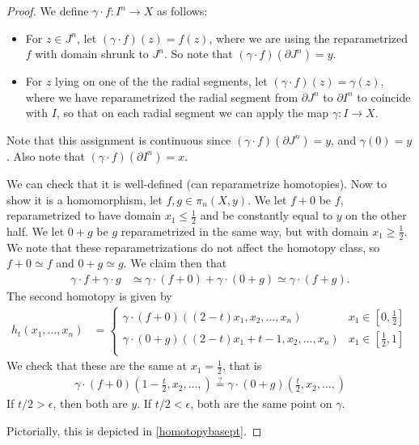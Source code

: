 \documentclass{article}[11pt]
\begin{document}
\begin{proof}
We define $\gamma\cdot f\colon I^n\to X$ as follows:
\begin{itemize}\itemsep=0em
\item For $z\in J^n$, let $(\gamma\cdot f)(z)=f(z)$, where we are using the reparametrized $f$ with domain shrunk to $J^n$. So note that $(\gamma\cdot f)(\partial J^n)=y.$
\item For $z$ lying on one of the the radial segments, let $(\gamma\cdot f)(z)=\gamma(z)$, where we have reparametrized the radial segment from $\partial J^n$ to $\partial I^n$ to coincide with $I$, so that on each radial segment we can apply the map $\gamma\colon I\to X$. 
\end{itemize}
Note that this assignment is continuous since $(\gamma\cdot f)(\partial J^n)=y$, and $\gamma(0)=y$. Also note that $(\gamma\cdot f)(\partial I^n)=x$.
 
We can check that it is well-defined (can reparametrize homotopies). Now to show it is a homomorphism, let $f,g \in \pi_n(X,y)$. We let $f + 0$ be $f$, reparametrized to have domain $x_1 \leq \frac{1}{2}$ and be constantly equal to $y$ on the other half. We let $0+g$ be $g$ reparametrized in the same way, but with domain $x_1 \geq \frac{1}{2}$. We note that these reparametrizations do not affect the homotopy class, so $f+0\simeq f$ and $0+g\simeq g$. We claim then that
\begin{align*}
	\gamma\cdot f + \gamma \cdot g &\simeq \gamma\cdot (f+0) + \gamma\cdot (0+g) \simeq \gamma\cdot  (f+g).
\end{align*}
The second homotopy is given by
\begin{align*}
	h_t (x_1,\ldots, x_n) &= \begin{cases} \gamma\cdot (f+0) ((2-t)x_1, x_2, \ldots, x_n) & x_1 \in \left[0,\frac{1}{2} \right] \\ \gamma\cdot (0+g)((2-t)x_1 + t-1, x_2, \ldots,x_n) & x_1 \in \left[\frac{1}{2}, 1\right] \\ \end{cases}
\end{align*}
We check that these are the same at $x_1 = \frac{1}{2}$, that is
\begin{align*}
	\gamma\cdot (f+0) (1-\frac{t}{2}, x_2, \ldots, ) \overset{?}{=} \gamma\cdot (0+g) \left( \frac{t}{2}, x_2, \ldots, \right)
\end{align*}	
If $t/2 > \epsilon$, then both are $y$. If $t/2 < \epsilon$, both are the same point on $\gamma$.

	Pictorially, this is depicted in \autoref{homotopybasept}.
	

\end{proof}
\end{document}
